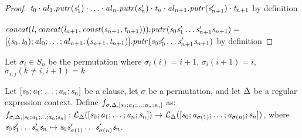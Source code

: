 \begin{lemma}
\begin{proof}
$\mathit{t}_0\cdot\mathit{al}_1.\mathit{putr}(\mathit{s}_1')\cdot\ldots\cdot\mathit{al}_n.\mathit{putr}(\mathit{s}_n')\cdot\mathit{t}_n\cdot\mathit{al}_{n+1}.\mathit{putr}(\mathit{s}_{n+1}')\cdot\mathit{t}_{n+1}$ by definition\\
\\
$\mathit{concat}(\mathit{l},\mathit{concat}(\mathit{l}_{n+1},\mathit{const}(\mathit{s}_{n+1},\mathit{t}_{n+1}))).\mathit{putr}
(\mathit{s}_0\mathit{s}_1'\ldots\mathit{s}_{n+1}'\mathit{s}_{n+1}) =$\\
$[(\mathit{s}_0,\mathit{t}_0);\mathit{al}_0;\ldots;\mathit{al}_{n+1};(\mathit{s}_{n+1},\mathit{t}_{n+1})].\mathit{putr}(\mathit{s}_0\mathit{s}_0'\ldots\mathit{s}_{n+1}'\mathit{s}_{n+1})$ by definition
\end{proof}
\end{lemma}

\begin{definition}
Let $\sigma_{i} \in S_n$ be the permutation where
$\sigma_{i}(i) = i+1$, $\sigma_{i}(i+1) = i$, $\sigma_{i,j}(k\neq i,i+1) = k$
\end{definition}

\begin{definition}
Let $[\mathit{s}_0;\mathit{a}_1;\ldots;\mathit{a}_n;\mathit{s}_n]$ be a clause, let $\sigma$ be a permutation, and let $\Delta$ be a regular expression context.
Define
$f_{\sigma,\Delta,[\mathit{s}_0;\mathit{a}_1;\ldots;\mathit{a}_n;\mathit{s}_n]}$ as:
$f_{\sigma,\Delta,[\mathit{s}_0;\mathit{a}_1;\ldots;\mathit{a}_n;\mathit{s}_n]}: \mathcal{L}_{\Delta}([\mathit{s}_0;\mathit{a}_1;\ldots;\mathit{a}_n;\mathit{s}_n])\rightarrow\mathcal{L}_{\Delta}([\mathit{s}_0;\mathit{a}_{\sigma(1)};\ldots;\mathit{a}_{\sigma(n)};\mathit{s}_n])$, where $\mathit{s}_0\mathit{s}_1'\ldots\mathit{s}_n'\mathit{s}_n\mapsto\mathit{s}_0\mathit{s}_{\sigma(1)}'\ldots\mathit{s}_{\sigma(n)}'\mathit{s}_n$.
\end{definition}

